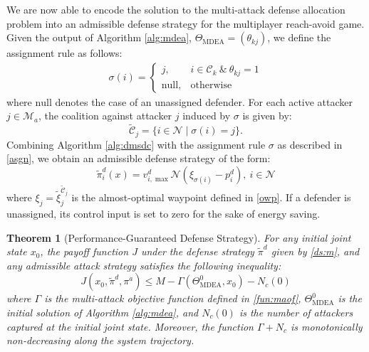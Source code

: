 \documentclass[journal]{IEEEtran}
\newtheorem{Theorem}{\bf Theorem}
\newcommand{\n}{\mathscr{N}}
\newcommand{\N}{\mathcal{N}}
\newcommand{\M}{\mathcal{M}}
\newcommand{\C}{\mathcal{C}}
\newcommand{\1}{\mathbf{1}}
\begin{document}
We are now able to encode the solution to the multi-attack defense allocation problem into an admissible defense strategy for the multiplayer reach-avoid game. Given the output of Algorithm \ref{alg:mdea}, $\Theta_{\text{MDEA}}=(\theta_{kj})$, we define the assignment rule as follows:
\begin{equation}\label{asgn}
	\begin{split}
		\sigma(i)=
		\begin{cases}
		j, &i\in \C_k~\&~\theta_{kj}=1\\
		\mathrm{null},& \text{otherwise}
		\end{cases}
	\end{split}
\end{equation}
where $\mathrm{null}$ denotes the case of an unassigned defender. For each active attacker $j\in \M_a$, the coalition against attacker $j$ induced by $\sigma$ is given by:
\begin{equation*}
	\tilde{\C}_j=\{i\in \N\mid\sigma(i)=j\}.
\end{equation*}
Combining Algorithm \ref{alg:dmsdc} with the assignment rule $\sigma$ as described in \eqref{asgn}, we obtain an admissible defense strategy of the form:
\begin{equation}\label{ds:m}
	\tilde{\pi}^d_i(x)=v^d_{i,\max}\n(\xi_{\sigma(i)}-p^d_i),~i\in \N
\end{equation}
where $\xi_j=\tilde{\xi}^{\tilde{\C}_j}_j$ is the almost-optimal waypoint defined in \eqref{owp}. If a defender is unassigned, its control input is set to zero for the sake of energy saving.

\begin{Theorem}[Performance-Guaranteed Defense Strategy]\label{thm:pgds}
For any initial joint state $x_0$, the payoff function $J$ under the defense strategy $\tilde{\pi}^d$ given by \eqref{ds:m}, and any admissible attack strategy satisfies the following inequality:
\begin{equation}\label{ineq:payoff}
	J(x_0,\tilde{\pi}^d,\pi^a)\leq M-\Gamma(\Theta_{\text{MDEA}}^0,x_0)-N_c(0)
\end{equation}
where $\Gamma$ is the multi-attack objective function defined in \eqref{fun:maof}, $\Theta_{\text{MDEA}}^0$ is the initial solution of Algorithm \ref{alg:mdea}, and $N_c(0)$ is the number of attackers captured at the initial joint state. Moreover, the function $\Gamma+N_c$ is monotonically non-decreasing along the system trajectory.
\end{Theorem}
\end{document}
